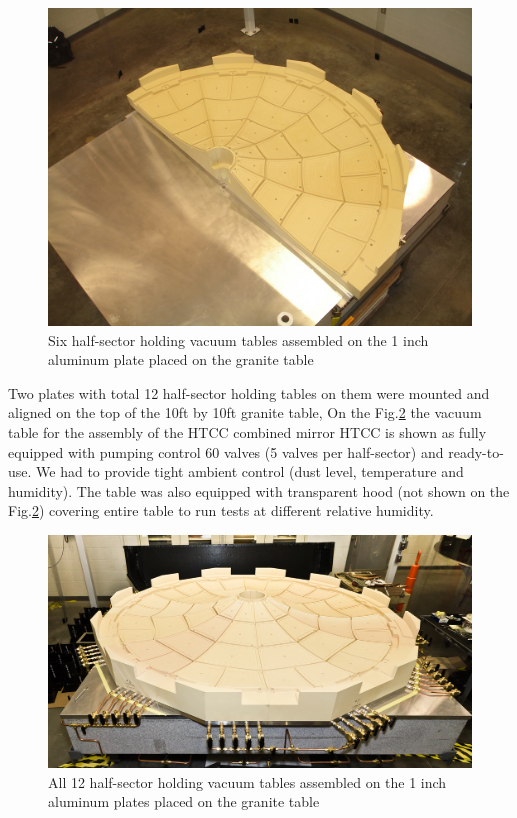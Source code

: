\begin{figure}[ht]
    \centering
    \includegraphics[width=1.0\linewidth]{images/Six_Foam_Vacuum_Tables.jpg}
    \caption{Six half-sector holding vacuum tables assembled on the 1 inch aluminum plate placed on the granite table}
    \label{fig:Six_Foam_Vacuum_Tables}
\end{figure}

\indent Two plates with total 12 half-sector holding tables on them were mounted and aligned on the top of the 10ft by 10ft granite table, On the Fig.\ref{fig:Twelve_Foam_Vacuum_Tables} the vacuum table for the assembly of the HTCC combined mirror HTCC is shown as fully equipped with pumping control 60 valves (5 valves per half-sector) and ready-to-use. We had to provide tight ambient control (dust level, temperature and humidity). The table was also equipped with transparent hood (not shown on the Fig.\ref{fig:Twelve_Foam_Vacuum_Tables}) covering entire table to run tests at different relative humidity.   

\begin{figure}[ht]
    \centering
    \includegraphics[width=1.0\linewidth]{images/Twelve_Foam_Vacuum_Tables.jpg}
    \caption{All 12 half-sector holding vacuum tables assembled on the 1 inch aluminum plates placed on the granite table}
    \label{fig:Twelve_Foam_Vacuum_Tables}
\end{figure}

